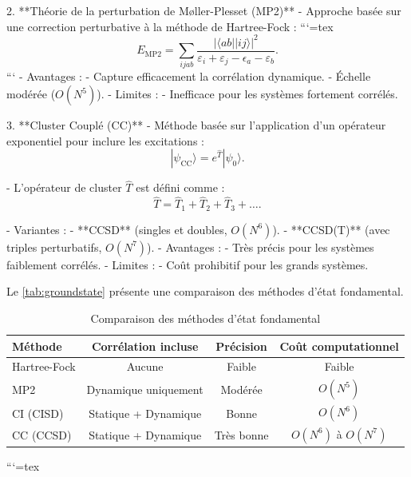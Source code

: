 \documentclass[12pt,a4paper]{report}
\begin{document}
\begin{markdown}
2. **Théorie de la perturbation de Møller-Plesset (MP2)**
   - Approche basée sur une correction perturbative à la méthode de Hartree-Fock :
```{=tex}
\[
E_{\text{MP2}} = \sum_{ijab} \frac{|\langle ab || ij \rangle|^2}{\varepsilon_i + \varepsilon_j - \epsilon_a - \varepsilon_b} .
\]
```
   - Avantages :
     - Capture efficacement la corrélation dynamique.
     - Échelle modérée (\(O(N^5)\)).
   - Limites :
     - Inefficace pour les systèmes fortement corrélés.

3. **Cluster Couplé (CC)**
   - Méthode basée sur l'application d'un opérateur exponentiel pour inclure les excitations :
\[
|\psi_{\text{CC}}\rangle = e^{\hat{T}} |\psi_0\rangle .
\]

   - L'opérateur de cluster \(\hat{T}\) est défini comme :
\[
\hat{T} = \hat{T}_1 + \hat{T}_2 + \hat{T}_3 + \dots .
\]

   - Variantes :
     - **CCSD** (singles et doubles, \(O(N^6)\)).
     - **CCSD(T)** (avec triples perturbatifs, \(O(N^7)\)).
   - Avantages :
     - Très précis pour les systèmes faiblement corrélés.
   - Limites :
     - Coût prohibitif pour les grands systèmes.

Le \autoref{tab:groundstate} présente une comparaison des méthodes d'état fondamental.

\begin{table}[h!]
\centering
\caption{Comparaison des méthodes d'état fondamental}
\begin{tabular}{@{}lccc@{}}
\toprule
\textbf{Méthode}       & \textbf{Corrélation incluse} & \textbf{Précision}  & \textbf{Coût computationnel} \\ \midrule
Hartree-Fock           & Aucune                      & Faible              & Faible                       \\
MP2                    & Dynamique uniquement        & Modérée             & $O(N^5)$                     \\
CI (CISD)              & Statique + Dynamique        & Bonne               & $O(N^6)$                     \\
CC (CCSD)              & Statique + Dynamique        & Très bonne          & $O(N^6)$ à $O(N^7)$          \\ \bottomrule
\end{tabular}
\label{tab:groundstate}
\end{table}


```{=tex}
\begin{tikzpicture}[
    mybox/.style={draw=black, thick, fill=blue!10, rounded corners, inner sep=10pt},
    title/.style={font=\bfseries}
]


\end{tikzpicture}
\end{markdown}
\end{document}
